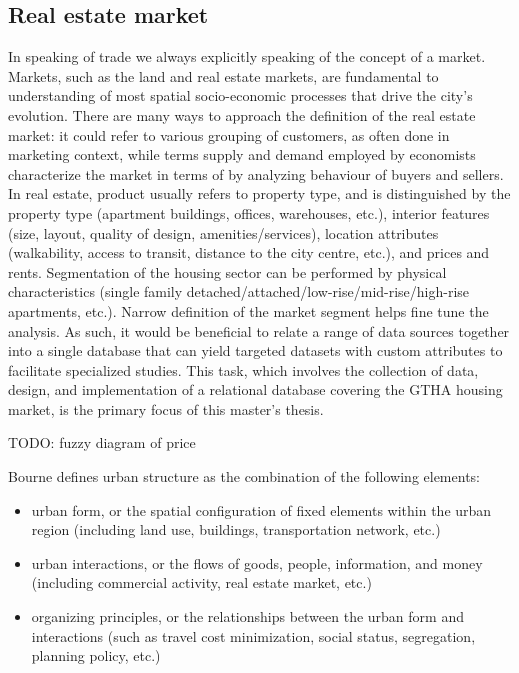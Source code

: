 \subsection{Real estate market} \label{subsec:real_estate_market}

In speaking of trade we always explicitly speaking of the concept of a market.
Markets, such as the land and real estate markets, are fundamental to understanding of most spatial socio-economic processes that drive the city's evolution.
There are many ways to approach the definition of the real estate market\cite{Brett2009}: it could refer to various grouping of customers, as often done in marketing context, while terms supply and demand employed by economists characterize the market in terms of by analyzing behaviour of buyers and sellers.
In real estate, product usually refers to property type, and is distinguished by the property type (apartment buildings, offices, warehouses, etc.), interior features (size, layout, quality of design, amenities/services), location attributes (walkability, access to transit, distance to the city centre, etc.), and prices and rents.
Segmentation of the housing sector can be performed by physical characteristics (single family detached/attached/low-rise/mid-rise/high-rise apartments, etc.).
Narrow definition of the market segment helps fine tune the analysis.
As such, it would be beneficial to relate a range of data sources together into a single database that can yield targeted datasets with custom attributes to facilitate specialized studies.
This task, which involves the collection of data, design, and implementation of a relational database covering the GTHA housing market, is the primary focus of this master's thesis.

TODO: fuzzy diagram of price

Bourne\cite{Bourne1982} defines urban structure as the combination of the following elements:
\begin{itemize}
    \item urban form, or the spatial configuration of fixed elements within the urban region (including land use, buildings, transportation network, etc.)
    \item urban interactions, or the flows of goods, people, information, and money (including commercial activity, real estate market, etc.)
    \item organizing principles, or the relationships between the urban form and interactions (such as travel cost minimization, social status, segregation, planning policy, etc.)
\end{itemize}
